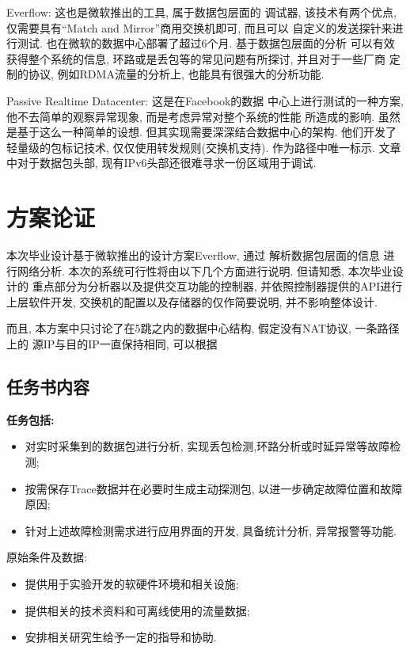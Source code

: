 {\begin{mdframed}[everyline=true]
Everflow:  这也是微软推出的工具,
属于数据包层面的 调试器, 该技术有两个优点, 仅需要具有``Match and
Mirror''商用交换机即可, 而且可以 自定义的发送探针来进行测试.
也在微软的数据中心部署了超过6个月. 基于数据包层面的分析
可以有效获得整个系统的信息, 环路或是丢包等的常见问题有所探讨,
并且对于一些厂商 定制的协议, 例如RDMA流量的分析上,
也能具有很强大的分析功能.

Passive Realtime Datacenter:  这是在Facebook的数据
中心上进行测试的一种方案, 他不去简单的观察异常现象,
而是考虑异常对整个系统的性能 所造成的影响. 虽然是基于这么一种简单的设想.
但其实现需要深深结合数据中心的架构. 他们开发了轻量级的包标记技术,
仅仅使用转发规则(交换机支持). 作为路径中唯一标示. 文章中对于数据包头部,
现有IPv6头部还很难寻求一份区域用于调试.



\section{方案论证}

本次毕业设计基于微软推出的设计方案Everflow,
通过 解析数据包层面的信息 进行网络分析.
本次的系统可行性将由以下几个方面进行说明. 但请知悉, 本次毕业设计的
重点部分为分析器以及提供交互功能的控制器,
并依照控制器提供的API进行上层软件开发,
交换机的配置以及存储器的仅作简要说明, 并不影响整体设计.

而且, 本方案中只讨论了在5跳之内的数据中心结构, 假定没有NAT协议, 一条路径上的
源IP与目的IP一直保持相同, 可以根据


\subsection{任务书内容}

\textbf{任务包括:}
\begin{itemize}
    \setlength\itemsep{0.1em}
    \item 对实时采集到的数据包进行分析, 实现丢包检测,环路分析或时延异常等故障检测;
    \item 按需保存Trace数据并在必要时生成主动探测包, 以进一步确定故障位置和故障原因;
    \item 针对上述故障检测需求进行应用界面的开发, 具备统计分析, 异常报警等功能.
\end{itemize}

原始条件及数据:
\begin{itemize}
    \setlength\itemsep{0.1em}
    \item 提供用于实验开发的软硬件环境和相关设施;
    \item 提供相关的技术资料和可离线使用的流量数据;
    \item 安排相关研究生给予一定的指导和协助.
\end{itemize}


\end{mdframed}}
